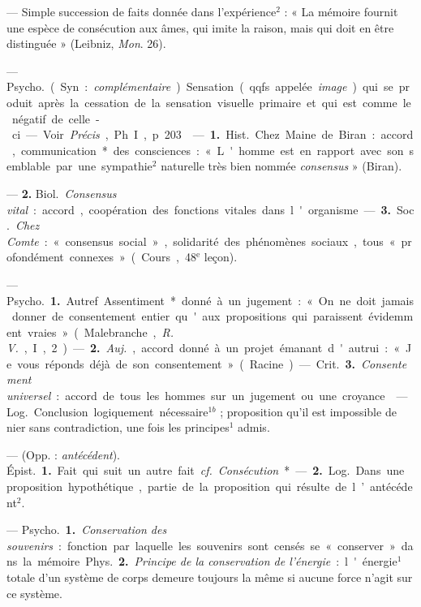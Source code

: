 \begin{itemize}[leftmargin=1cm, label=, itemsep=11pt]
 — Simple succession de
faits donnée dans l'expérience$^2$ :
« La mémoire fournit une espèce de
consécution aux âmes, qui imite la
raison, mais qui doit en être distinguée » (Leibniz, {\it Mon}. 26).

 — \si{Psycho.}
(Syn. : {\it complémentaire}) Sensation
(qqfs appelée {\it image}) qui se produit
après la cessation de la sensation
visuelle primaire et qui est comme
le négatif de celle-ci. — Voir  {\it Précis},
Ph. I, p. 203.

 — {\bf 1.} \si{Hist.} Chez Maine de
Biran : accord, communication*
des consciences : « L'homme est en
rapport avec son semblable par une
sympathie$^2$ naturelle très bien
nommée {\it consensus} » (Biran).

— {\bf 2.} \si{Biol.} {\it Consensus vital} : accord, coopération des fonctions vitales dans l'organisme.

— {\bf 3.} \si{Soc.} {\it Chez Comte} : « consensus
social », solidarité des phénomènes
sociaux, tous « profondément connexes » (Cours, 48$^\text{e}$ leçon).

 — \si{Psycho.} {\bf 1.} Autref.
Assentiment* donné à un jugement : « On ne doit jamais donner de
consentement entier qu'aux propositions qui paraissent évidemment
vraies » (Malebranche, {\it R. V.}, I, 2). —
 {\bf 2.}  {\it Auj.}, accord donné à un projet
émanant d'autrui : « Je vous réponds
déjà de son consentement » (Racine).

— \si{Crit.} {\bf 3.} {\it Consentement universel} : accord de tous les hommes
sur un jugement ou une croyance.

 — \si{Log.} Conclusion logiquement nécessaire$^{1b}$ ; proposition
qu’il est impossible de nier sans
contradiction, une fois les principes$^1$
admis.

 — (Opp. : {\it antécédent}).
\si{Épist.} {\bf 1.} Fait qui suit un autre fait.
{\it cf.} {\it Consécution}*. — {\bf 2.} \si{Log.} Dans
une proposition hypothétique, partie
de la proposition qui résulte de
l’antécédent$^2$.

 — \si{Psycho.} {\bf 1.} {\it Conservation des souvenirs} : fonction par
laquelle les souvenirs sont censés se
« conserver » dans la mémoire.

\si{Phys.} {\bf 2.} {\it Principe de la conservation de l’énergie} : l'énergie$^1$ totale
d’un système de corps demeure toujours la même si aucune force n’agit
sur ce système.


\end{itemize}
